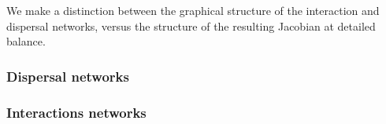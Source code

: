 \documentclass[12pt]{article}
\begin{document}
We make a distinction between the graphical structure of the interaction and dispersal networks, versus the structure of the resulting Jacobian at detailed balance. 

\subsubsection*{Dispersal networks}
\subsubsection*{Interactions networks}


\end{document}
